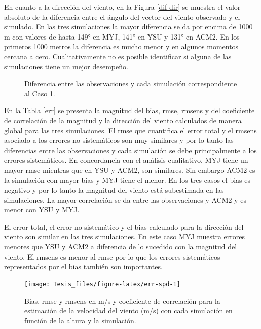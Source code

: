 \documentclass[12pt,spanish,oneside, a4paper]{book}
\begin{document}
En cuanto a la dirección del viento, en la Figura \ref{dif-dir} se
muestra el valor absoluto de la diferencia entre el ángulo del vector
del viento observado y el simulado. En las tres simulaciones la mayor
diferencia se da por encima de 1000 m con valores de hasta 149° en MYJ,
141° en YSU y 131° en ACM2. En los primeros 1000 metros la diferencia es
mucho menor y en algunos momentos cercana a cero. Cualitativamente no es
posible identificar si alguna de las simulaciones tiene un mejor
desempeño.

\begin{figure}
\caption{Diferencia entre las observaciones y cada simulación  correspondiente al Caso 1. \label{dif}}\label{fig:diferencia}
\end{figure}

En la Tabla \ref{err} se presenta la magnitud del bias, rmse, rmsens y
del coeficiente de correlación de la magnitud y la dirección del viento
calculados de manera global para las tres simulaciones. El rmse que
cuantifica el error total y el rmsens asociado a los errores no
sistemáticos son muy similares y por lo tanto las diferencias entre las
observaciones y cada simulación se debe principalmente a los errores
sistemáticos. En concordancia con el análisis cualitativo, MYJ tiene un
mayor rmse mientras que en YSU y ACM2, son similares. Sin embargo ACM2
es la simulación con mayor bias y MYJ tiene el menor. En los tres casos
el bias es negativo y por lo tanto la magnitud del viento está
subestimada en las simulaciones. La mayor correlación se da entre las
observaciones y ACM2 y es menor con YSU y MYJ.

El error total, el error no sistemático y el bias calculado para la
dirección del viento son similar en las tres simulaciones. En este caso
MYJ muestra errores menores que YSU y ACM2 a diferencia de lo sucedido
con la magnitud del viento. El rmsens es menor al rmse por lo que los
errores sistemáticos representados por el bias también son importantes.

\begin{figure}

{\centering \texttt{[image: Tesis\_files/figure-latex/err-spd-1]} 

}

\caption{Bias, rmse y rmsens en m/s y coeficiente de correlación para la estimación de la velocidad del viento (m/s) con cada simulación en función de la altura y la simulación. \label{err-spd}}\label{fig:err-spd}
\end{figure}
\end{document}
